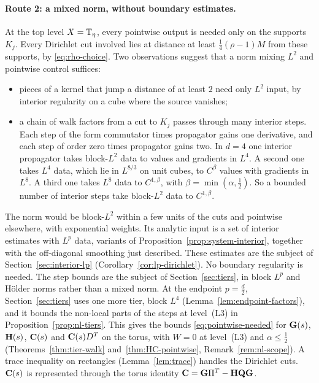 \paragraph{Route 2: a mixed norm, without boundary estimates.} At the top level $X=\mathbb T_\eta$, every pointwise output is needed only on the supports $K_j$. Every Dirichlet cut involved lies at distance at least $\frac14(\rho-1)M$ from these supports, by \eqref{eq:rho-choice}. Two observations suggest that a norm mixing $L^2$ and pointwise control suffices:
\begin{itemize}
\item pieces of a kernel that jump a distance of at least $2$ need only $L^2$ input, by interior regularity on a cube where the source vanishes;
\item a chain of walk factors from a cut to $K_j$ passes through many interior steps. Each step of the form commutator times propagator gains one derivative, and each step of order zero times propagator gains two. In $d=4$ one interior propagator takes block-$L^2$ data to values and gradients in $L^4$. A second one takes $L^4$ data, which lie in $L^{8/3}$ on unit cubes, to $C^\beta$ values with gradients in $L^8$. A third one takes $L^8$ data to $C^{1,\beta}$, with $\beta=\min(\alpha,\frac12)$. So a bounded number of interior steps take block-$L^2$ data to $C^{1,\beta}$.
\end{itemize}
The norm would be block-$L^2$ within a few units of the cuts and pointwise elsewhere, with exponential weights. Its analytic input is a set of interior estimates with $L^p$ data, variants of Proposition~\ref{prop:system-interior}, together with the off-diagonal smoothing just described. These estimates are the subject of Section~\ref{sec:interior-lp} (Corollary~\ref{cor:lp-dirichlet}). No boundary regularity is needed. The step bounds are the subject of Section~\ref{sec:tiers}, in block $L^p$ and H\"older norms rather than a mixed norm. At the endpoint $p=\frac d2$, Section~\ref{sec:tiers} uses one more tier, block $L^4$ (Lemma~\ref{lem:endpoint-factors}), and it bounds the non-local parts of the steps at level~(L3) in Proposition~\ref{prop:nl-tiers}. This gives the bounds \eqref{eq:pointwise-needed} for $\mathbf G(s)$, $\mathbf H(s)$, $\mathbf C(s)$ and $\mathbf C(s)D^T$ on the torus, with $W=0$ at level~(L3) and $\alpha\le\frac12$ (Theorems~\ref{thm:tier-walk} and~\ref{thm:HC-pointwise}, Remark~\ref{rem:nl-scope}). A trace inequality on rectangles (Lemma~\ref{lem:trace}) handles the Dirichlet cuts. $\mathbf C(s)$ is represented through the torus identity $\mathbf C=\mathbf G\Pi^T-\mathbf H\mathbf Q\mathbf G$.

